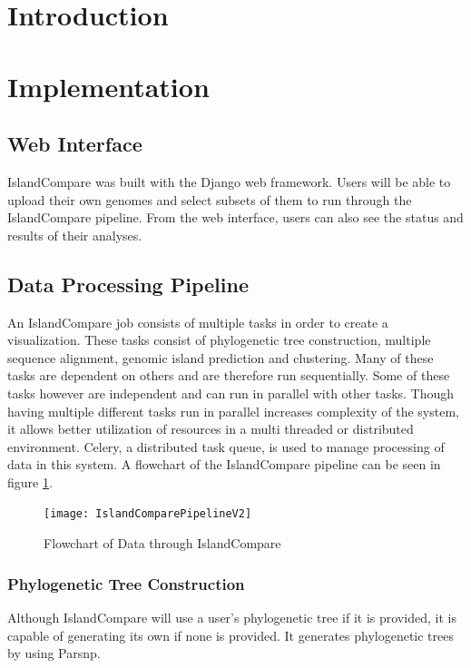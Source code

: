 	\section{Introduction}
        
	\section{Implementation}
	
	\subsection{Web Interface}
		IslandCompare was built with the Django web framework.\cite{8_django_2016} Users will be able to upload their own genomes and select subsets of them to run through the IslandCompare pipeline. From the web interface, users can also see the status and results of their analyses.
	
	\subsection{Data Processing Pipeline}
		An IslandCompare job consists of multiple tasks in order to create a visualization. These tasks consist of phylogenetic tree construction, multiple sequence alignment, genomic island prediction and clustering. Many of these tasks are dependent on others and are therefore run sequentially. Some of these tasks however are independent and can run in parallel with other tasks. Though having multiple different tasks run in parallel increases complexity of the system, it allows better utilization of resources in a multi threaded or distributed environment. Celery, a distributed task queue, is used to manage processing of data in this system.\cite{9_celery} A flowchart of the IslandCompare pipeline can be seen in figure \ref{fig:islandcomparepipeline}.
		
		\begin{figure}[h]
			\centering
			\texttt{[image: IslandComparePipelineV2]}
			\caption{\label{fig:islandcomparepipeline} Flowchart of Data through IslandCompare}
		\end{figure}
	
	\subsubsection{Phylogenetic Tree Construction}
		Although IslandCompare will use a user's phylogenetic tree if it is provided, it is capable of generating its own if none is provided. It generates phylogenetic trees by using Parsnp.\cite{7_treangen_ondov_koren_phillippy_2014}
	

